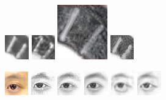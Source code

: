 \documentclass[10pt,twocolumn,letterpaper]{article}
\begin{document}
\begin{figure}[t]
\begin{minipage}[t]{1\linewidth}
\includegraphics[width=0.11\linewidth]{img/hairpin_fcnn_patch.png}
\includegraphics[width=0.11\linewidth]{img/hairpin_bfcn_patch.png}
\includegraphics[width=0.11\linewidth]{img/hairpin_deepart_patch.jpg}
\includegraphics[width=0.11\linewidth]{img/hairpin_ours_patch.png}
\end{minipage}
\begin{minipage}[t]{1\linewidth}
\centering
\includegraphics[width=0.11\linewidth]{img/eye_photo.png}
\includegraphics[width=0.11\linewidth]{img/eye_mrf.png}
\includegraphics[width=0.11\linewidth]{img/eye_wmrf.png}
\includegraphics[width=0.11\linewidth]{img/eye_ssd.png}
\includegraphics[width=0.11\linewidth]{img/eye_fcnn.png}
\includegraphics[width=0.11\linewidth]{img/eye_bfcn.png}

\end{minipage}
\end{figure}
\end{document}
